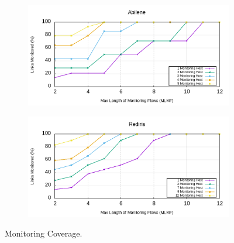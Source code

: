\documentclass[10pt, journal, letterpaper]{IEEEtran}
\begin{document}
\begin{figure}
    \begin{subfigure}{\columnwidth}
       \centering
        \includegraphics[width=0.8\columnwidth]{img/eval_Abilene_Max_Length_of_Routes_Links_Monitored.png}
        \label{fig:eval_Abilene_Max_Length_of_Routes_Links_Monitored}
    \end{subfigure}
    \begin{subfigure}{\columnwidth}
      \centering
      \includegraphics[width=0.8\columnwidth]{img/eval_Rediris_Max_Length_of_Routes_Links_Monitored.png}
     \label{fig:eval_RedIris_Max_Length_of_Routes_Links_Monitored}
    \end{subfigure}
    \caption{Monitoring Coverage.}
    \label{fig:Max_Length_of_Routes_Links_Monitored}
\end{figure}
\end{document}
